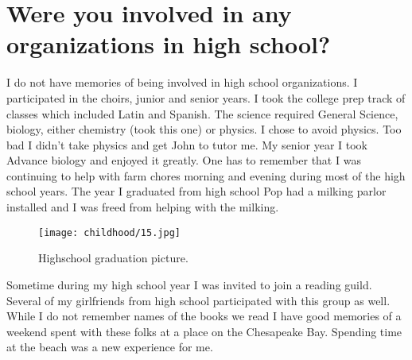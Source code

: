 \section{Were you involved in any organizations in high school?}
I do not have memories of being involved in high school organizations.
I participated in the choirs, junior and senior years.
I took the college prep track of classes which included Latin and Spanish.
The science required General Science, biology, either chemistry (took this one) or physics.
I chose to avoid physics.
Too bad I didn't take physics and get John to tutor me.
My senior year I took Advance biology and enjoyed it greatly.
One has to remember that I was continuing to help with farm chores morning and evening during most of the high school years.
The year I graduated from high school Pop had a milking parlor installed and I was freed from helping with the milking.
\begin{figure}
\centering
\texttt{[image: childhood/15.jpg]}
\caption{
Highschool graduation picture.
}
\end{figure}

Sometime during my high school year I was invited to join a reading guild.
Several of my girlfriends from high school participated with this group as well.
While I do not remember names of the books we read I have good memories of a weekend spent with these folks at a place on the Chesapeake Bay.
Spending time at the beach was a new experience for me.






